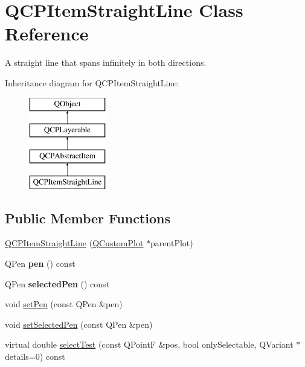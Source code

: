\hypertarget{class_q_c_p_item_straight_line}{}\section{Q\+C\+P\+Item\+Straight\+Line Class Reference}
\label{class_q_c_p_item_straight_line}


A straight line that spans infinitely in both directions.  


Inheritance diagram for Q\+C\+P\+Item\+Straight\+Line\+:\begin{figure}[H]
\begin{center}
\leavevmode
\includegraphics[height=4.000000cm]{class_q_c_p_item_straight_line}
\end{center}
\end{figure}
\subsection*{Public Member Functions}
\begin{DoxyCompactItemize}
\item 
\mbox{\hyperlink{class_q_c_p_item_straight_line_a41fd2e1f006983449eca9830930c3b10}{Q\+C\+P\+Item\+Straight\+Line}} (\mbox{\hyperlink{class_q_custom_plot}{Q\+Custom\+Plot}} $\ast$parent\+Plot)
\item 
\mbox{\label{class_q_c_p_item_straight_line_aa751d46cf36073607c11508763f85ff6}} 
Q\+Pen {\bfseries pen} () const
\item 
\mbox{\label{class_q_c_p_item_straight_line_ae4a4607045b1d0594f89eee448a31ff9}} 
Q\+Pen {\bfseries selected\+Pen} () const
\item 
void \mbox{\hyperlink{class_q_c_p_item_straight_line_a9f36c9c9e60d7d9ac084c80380ac8601}{set\+Pen}} (const Q\+Pen \&pen)
\item 
void \mbox{\hyperlink{class_q_c_p_item_straight_line_a5c33559498d33543fa95cf0a36e851ff}{set\+Selected\+Pen}} (const Q\+Pen \&pen)
\item 
virtual double \mbox{\hyperlink{class_q_c_p_item_straight_line_a1e5d99d79efb5871600c72bcd2891a0f}{select\+Test}} (const Q\+PointF \&pos, bool only\+Selectable, Q\+Variant $\ast$details=0) const
\end{DoxyCompactItemize}
